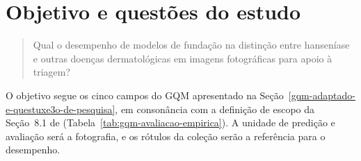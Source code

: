 \section{Objetivo e questões do estudo}
\label{sec:objetivo-avaliacao-empirica}

\begin{samepage}
	\begin{quote}
		Qual o desempenho de modelos de fundação na distinção entre hanseníase e
		outras doenças dermatológicas em imagens fotográficas para apoio à
		triagem?
	\end{quote}
\end{samepage}

O objetivo segue os cinco campos do GQM apresentado na
Seção~\ref{gqm-adaptado-e-questuxe3o-de-pesquisa}, em consonância com a
definição de escopo da Seção~8.1 de 
(Tabela~\ref{tab:gqm-avaliacao-empirica}). A unidade de predição e
avaliação será a fotografia, e os rótulos da coleção serão a referência
para o desempenho.

